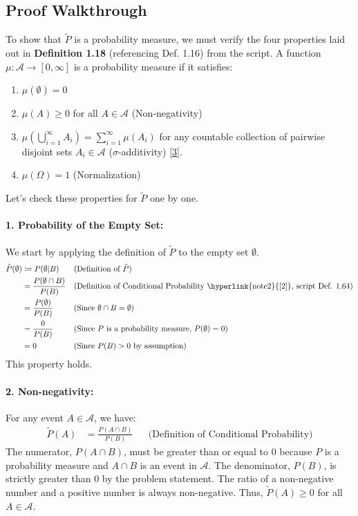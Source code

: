 \documentclass[11pt,a4paper]{article}
\begin{document}
\subsection*{Proof Walkthrough}
To show that \(\tilde{P}\) is a probability measure, we must verify the four properties laid out in \textbf{Definition 1.18} (referencing Def. 1.16) from the script. A function \(\mu: \mathcal{A} \to [0, \infty]\) is a probability measure if it satisfies:
\begin{enumerate}
    \item \(\mu(\emptyset) = 0\)
    \item \(\mu(A) \geq 0\) for all \(A \in \mathcal{A}\) (Non-negativity)
    \item \(\mu\left(\bigcup_{i=1}^\infty A_i\right) = \sum_{i=1}^\infty \mu(A_i)\) for any countable collection of pairwise disjoint sets \(A_i \in \mathcal{A}\) (\(\sigma\)-additivity) \hyperlink{note3}{[3]}.
    \item \(\mu(\Omega) = 1\) (Normalization)
\end{enumerate}
Let's check these properties for \(\tilde{P}\) one by one.

\paragraph{1. Probability of the Empty Set:}
We start by applying the definition of \(\tilde{P}\) to the empty set \(\emptyset\).
\begin{align*}
    \tilde{P}(\emptyset) &\coloneqq P(\emptyset | B) && \text{(Definition of \(\tilde{P}\))} \\
    &= \frac{P(\emptyset \cap B)}{P(B)} && \text{(Definition of Conditional Probability \hyperlink{note2}{[2]}, script Def. 1.64)} \\
    &= \frac{P(\emptyset)}{P(B)} && \text{(Since \(\emptyset \cap B = \emptyset\))} \\
    &= \frac{0}{P(B)} && \text{(Since \(P\) is a probability measure, \(P(\emptyset)=0\))} \\
    &= 0 && \text{(Since \(P(B) > 0\) by assumption)}
\end{align*}
This property holds.

\paragraph{2. Non-negativity:}
For any event \(A \in \mathcal{A}\), we have:
\begin{align*}
    \tilde{P}(A) &= \frac{P(A \cap B)}{P(B)} && \text{(Definition of Conditional Probability)}
\end{align*}
The numerator, \(P(A \cap B)\), must be greater than or equal to 0 because \(P\) is a probability measure and \(A \cap B\) is an event in \(\mathcal{A}\). The denominator, \(P(B)\), is strictly greater than 0 by the problem statement. The ratio of a non-negative number and a positive number is always non-negative. Thus, \(\tilde{P}(A) \geq 0\) for all \(A \in \mathcal{A}\).
\end{document}
